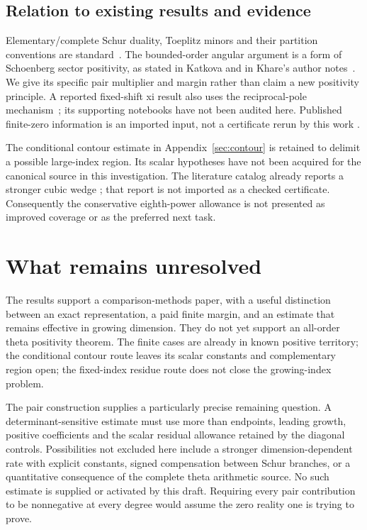 \documentclass[11pt]{article}
\theoremstyle{remark}
\begin{document}
\subsection{Relation to existing results and evidence}
Elementary/complete Schur duality, Toeplitz minors and their partition
conventions are standard~\cite{GarciaGarciaTierz2020Accepted}.
The bounded-order angular argument is a form of Schoenberg sector
positivity, as stated in Katkova and in Khare's author
notes~\cite{Schoenberg1955Descartes,Katkova0505174v1,KhareMath341Retrieved20261104}.
We give its specific pair multiplier and margin rather than claim a new
positivity principle. A reported fixed-shift xi result also uses the
reciprocal-pole mechanism~\cite{KenanFifteenShifts2026}; its supporting
notebooks have not been audited here. Published finite-zero information
is an imported input, not a certificate rerun by this work
\cite{PlattTrudgian200409765v1}.

The conditional contour estimate in Appendix~\ref{sec:contour} is retained
to delimit a possible large-index region. Its scalar hypotheses have
not been acquired for the canonical source in this investigation. The
literature catalog already reports a stronger cubic wedge
\cite{Michalowski260716795v1}; that report is not imported as a checked
certificate. Consequently the conservative eighth-power allowance is
not presented as improved coverage or as the preferred next task.





\section{What remains unresolved}\label{sec:outlook}
The results support a comparison-methods paper, with a useful distinction
between an exact representation, a paid finite margin, and an estimate
that remains effective in growing dimension. They do not yet support an
all-order theta positivity theorem. The finite cases are already in known
positive territory; the conditional contour route leaves its scalar
constants and complementary region open; the fixed-index residue route
does not close the growing-index problem.

The pair construction supplies a particularly precise remaining question.
A determinant-sensitive estimate must use more than endpoints, leading
growth, positive coefficients and the scalar residual allowance retained
by the diagonal controls. Possibilities not excluded here include a
stronger dimension-dependent rate with explicit constants, signed
compensation between Schur branches, or a quantitative consequence of
the complete theta arithmetic source. No such estimate is supplied or
activated by this draft. Requiring every pair contribution to be
nonnegative at every degree would assume the zero reality one is trying
to prove.
\end{document}
